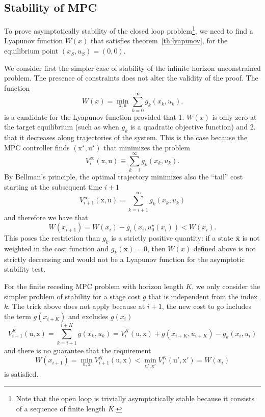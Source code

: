 \documentclass[11pt]{report}
\newcommand{\bs}[1]{\boldsymbol{#1}}
\newcommand{\bsu}{\bs{\mathrm{u}}}
\newcommand{\bsx}{\bs{\mathrm{x}}}
\begin{document}
\subsection{Stability of MPC}
\label{sec:stability-MPC}

To prove asymptotically stability of the closed loop problem\footnote{Note that the open loop is trivially asymptotically stable because it consists of a sequence of finite length $K$.}, we need to find a Lyapunov function $W(x)$ that satisfies theorem~\ref{th:lyapunov}, for the equilibrium point $(x_S,u_S)=(0,0)$.

We consider first the simpler case of stability of the infinite horizon unconstrained problem. The presence of constraints does not alter the validity of the proof. The function
\begin{equation*}
  W(x) = \min_{\bsx,\bsu} \sum_{k=0}^\infty g_k(x_k,u_k).
\end{equation*}
is a candidate for the Lyapunov function provided that 1. $W(x)$ is only zero at the target equilibrium (such as when $g_k$ is a quadratic objective function) and 2. that it decreases along trajectories of the system. This is the case because the MPC controller finds $(\bsx^\star, \bsu^\star)$ that minimizes the problem
\begin{equation*}
  V^\infty_i(\bsx,\bsu) \equiv \sum_{k=i}^\infty g_k(x_k,u_k).
\end{equation*}
By Bellman's principle, the optimal trajectory minimizes also the ``tail'' cost starting at the subsequent time $i+1$
\begin{equation*}
  V_{i+1}^\infty(\bsx,\bsu) = \sum_{k=i+1}^\infty g_k(x_k,u_k)
\end{equation*}
and therefore we have that
\begin{equation*}
  W(x_{i+1}) = W(x_i) - g_i(x_i,u_0^\star(x_i)) < W(x_i).
\end{equation*}
This poses the restriction than $g_k$ is a strictly positive quantity: if a state $\bs{\bar{x}}$ is not weighted in the cost function and $g_k(\bs{\bar{x}})=0$, then $W(x)$ defined above is not strictly decreasing and would not be a Lyapunov function for the asymptotic stability test.

For the finite receding MPC problem with horizon length $K$, we only consider the simpler problem of stability for a stage cost $g$ that is independent from the index $k$. The trick above does not apply because at $i+1$, the new cost to go includes the term $g(x_{i+K})$ and excludes $g(x_i)$
\begin{equation*}
  V^K_{i+1}(\bsu,\bsx) = \sum_{k=i+1}^{i+K}g(x_k,u_k) = V_i^K(\bsu,\bsx) + g(x_{i+K},u_{i+K}) - g_k(x_i,u_i)
\end{equation*}
and there is no guarantee that the requirement
\begin{equation*}
  W(x_{i+1}) = \min_{\bsu,\bsx} V^K_{i+1}(\bsu,\bsx) < \min_{\bsu',\bsx'} V^K_i(\bsu',\bsx') = W(x_i)
\end{equation*}
is satisfied.
\end{document}
